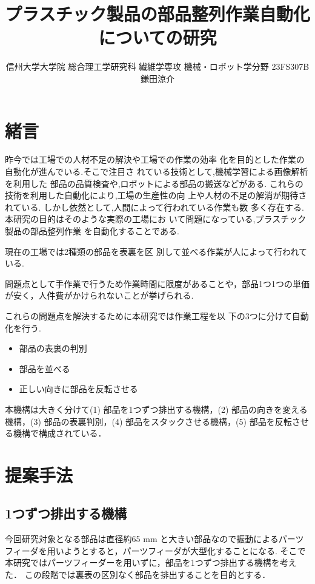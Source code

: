 \documentclass{classes/resume}
\title{
	プラスチック製品の部品整列作業自動化についての研究
}
\author{
	信州大学大学院 総合理工学研究科 繊維学専攻 機械・ロボット学分野 23FS307B 鎌田涼介
}
\begin{document}
\maketitle
\section{緒言}
昨今では工場での人材不足の解決や工場での作業の効率
化を目的とした作業の自動化が進んでいる.そこで注目さ
れている技術として,機械学習による画像解析を利用した
部品の品質検査や,ロボットによる部品の搬送などがある.
これらの技術を利用した自動化により,工場の生産性の向
上や人材の不足の解消が期待されている.
しかし依然として,人間によって行われている作業も数
多く存在する.本研究の目的はそのような実際の工場にお
いて問題になっている,プラスチック製品の部品整列作業
を自動化することである.

現在の工場では2種類の部品を表裏を区
別して並べる作業が人によって行われている.

問題点として手作業で行うため作業時間に限度があることや，部品1つ1つの単価が安く，人件費がかけられないことが挙げられる.

これらの問題点を解決するために本研究では作業工程を以
下の3つに分けて自動化を行う.
\vspace*{-0.5\zh}
\begin{itemize}
    \item 部品の表裏の判別
    \item 部品を並べる
    \item 正しい向きに部品を反転させる
\end{itemize}
\vspace*{-0.5\zh}

本機構は大きく分けて(1) 部品を1つずつ排出する機構，(2) 部品の向きを変える機構，(3) 部品の表裏判別，(4) 部品をスタックさせる機構，(5) 部品を反転させる機構で構成されている．


\section{提案手法}
\subsection{1つずつ排出する機構}
    今回研究対象となる部品は直径約65 mm と大きい部品なので振動によるパーツフィーダを用いようとすると，パーツフィーダが大型化することになる\cite{ref:フィーダー}.
    そこで本研究ではパーツフィーダーを用いずに，部品を1つずつ排出する機構を考えた．
    この段階では裏表の区別なく部品を排出することを目的とする．
\end{document}
